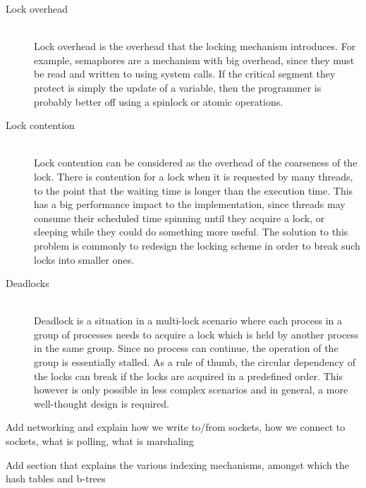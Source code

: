 \begin{description}
	\item[Lock overhead] \hfill \\
		Lock overhead is the overhead that the locking mechanism 
		introduces.  For example, semaphores are a mechanism with big 
		overhead, since they must be read and written to using system 
		calls. If the critical segment they protect is simply the 
		update of a variable, then the programmer is probably better 
		off using a spinlock or atomic operations.
	\item[Lock contention] \hfill \\
		Lock contention can be considered as the overhead of the 
		coarseness of the lock. There is contention for a lock when it 
		is requested by many threads, to the point that the waiting 
		time is longer than the execution time.
		This has a big performance impact to the implementation, since 
		threads may consume their scheduled time spinning until they 
		acquire a lock, or sleeping while they could do something more 
		useful.
		The solution to this problem is commonly to redesign the 
		locking scheme in order to break such locks into smaller ones.
	\item[Deadlocks] \hfill \\
		Deadlock is a situation in a multi-lock scenario where each 
		process in a group of processes needs to acquire a lock which 
		is held by another process in the same group. Since no process 
		can continue, the operation of the group is essentially 
		stalled.
		As a rule of thumb, the circular dependency of the locks can 
		break if the locks are acquired in a predefined order. This 
		however is only possible in less complex scenarios and in 
		general, a more well-thought design is required.
\end{description}

\todo Add networking and explain how we write to/from sockets, how we connect 
to sockets, what is polling, what is marshaling

\todo Add section that explains the various indexing mechanisms, amongst which 
the hash tables and b-trees
